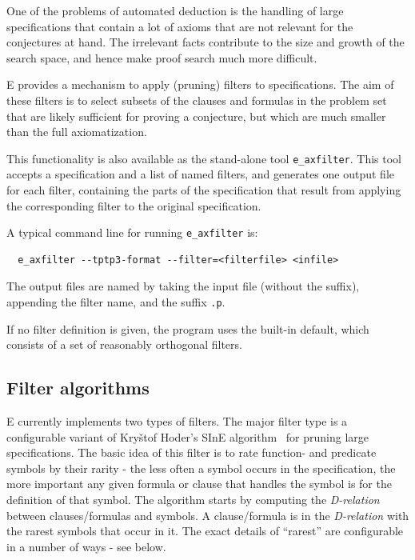 \documentclass{report}
\begin{document}
One of the problems of automated deduction is the handling of large
specifications that contain a lot of axioms that are not relevant for
the conjectures at hand. The irrelevant facts contribute to the size
and growth of the search space, and hence make proof search much more
difficult.

E provides a mechanism to apply (pruning) filters to
specifications. The aim of these filters is to select subsets of the
clauses and formulas in the problem set that are likely sufficient for
proving a conjecture, but which are much smaller than the full
axiomatization.

This functionality is also available as the stand-alone tool
\texttt{e\_axfilter}. This tool accepts a specification and a list of
named filters, and generates one output file for each filter,
containing the parts of the specification that result from applying
the corresponding filter to the original specification.

A typical command line for running \texttt{e\_axfilter} is:

\begin{verbatim}
  e_axfilter --tptp3-format --filter=<filterfile> <infile>
\end{verbatim}

The output files are named by taking the input file (without the
suffix), appending the filter name, and the suffix \texttt{.p}.

If no filter definition is given, the program uses the built-in
default, which consists of a set of reasonably orthogonal filters.



\subsection{Filter algorithms}

E currently implements two types of filters. The major filter type is
a configurable variant of Kry\v{s}tof Hoder's SInE
algorithm~\cite{HV:CADE-2011} for pruning large specifications. The
basic idea of this filter is to rate function- and predicate symbols
by their rarity - the less often a symbol occurs in the specification,
the more important any given formula or clause that handles the symbol
is for the definition of that symbol. The algorithm starts by
computing the \emph{D-relation} between clauses/formulas and
symbols. A clause/formula is in the \emph{D-relation} with the rarest
symbols that occur in it. The exact details of ``rarest'' are
configurable in a number of ways - see below.
\end{document}
